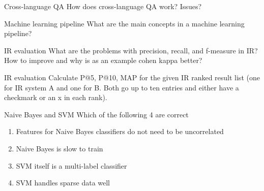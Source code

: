 \documentclass{article}
\begin{document}
\begin{exercise}{Cross-language QA}
  How does cross-language QA work? Issues?

  \begin{solution}
  \end{solution}
\end{exercise}

\begin{exercise}{Machine learning pipeline}
  What are the main concepts in a machine learning pipeline?

  \begin{solution}
  \end{solution}
\end{exercise}

\begin{exercise}{IR evaluation}
  What are the problems with precision, recall, and f-measure in IR? How to improve and why is as an example cohen kappa better?

  \begin{solution}
  \end{solution}
\end{exercise}

\begin{exercise}{IR evaluation}
  Calculate P@5, P@10, MAP for the given IR ranked result list (one for IR system A and one for B. Both go up to ten entries and either have a checkmark or an x in each rank).

  \begin{solution}
  \end{solution}
\end{exercise}

\begin{exercise}{Naive Bayes and SVM}
  Which of the following 4 are correct
  \begin{enumerate}
    \item Features for Naive Bayes classifiers do not need to be uncorrelated
    \item Naive Bayes is slow to train
    \item SVM itself is a multi-label classifier
    \item SVM handles sparse data well
  \end{enumerate}

  \begin{solution}
  \end{solution}
\end{exercise}
\end{document}
